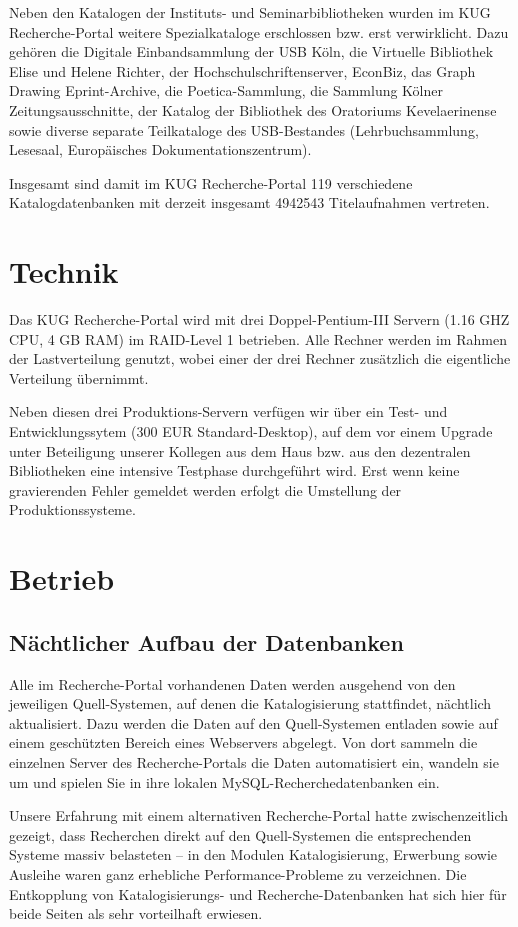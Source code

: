 \documentclass[11pt, twoside, a4paper, BCOR8mm, DIV12, bibtotoc,idxtotoc]{scrbook}
\begin{document}
Neben den Katalogen der Instituts- und Seminarbibliotheken wurden im
KUG Recherche-Portal weitere Spezialkataloge
erschlossen bzw. erst verwirklicht. Dazu gehören die Digitale
Einband\-samm\-lung der USB Köln, die Virtuelle Bibliothek Elise und
Helene Richter, der Hoch\-schul\-schrif\-ten\-ser\-ver, EconBiz, das Graph
Drawing Eprint-Archive, die Poetica-Sammlung, die Sammlung Kölner
Zeitungsausschnitte, der Katalog der  Bibliothek des Oratoriums
Kevelaerinense sowie diverse separate Teilkataloge des USB-Bestandes
(Lehrbuchsammlung, Lesesaal, Europäisches Do\-ku\-men\-ta\-tions\-zen\-trum).

Insgesamt sind damit im KUG Recherche-Portal 119 verschiedene
Katalogdatenbanken mit derzeit insgesamt 4942543 Titelaufnahmen
vertreten.

\section{Technik}
Das KUG Recherche-Portal wird mit drei Doppel-Pentium-III Servern
(1.16 GHZ CPU, 4 GB RAM) im RAID-Level 1 betrieben. Alle Rechner
werden im Rahmen der Lastverteilung genutzt, wobei einer der drei
Rechner zusätzlich die eigentliche Verteilung übernimmt.

Neben diesen drei Produktions-Servern verfügen wir über ein Test-
und Entwicklungssytem (300 EUR Standard-Desktop), auf dem vor einem
Upgrade unter Beteiligung unserer Kollegen aus dem Haus bzw. aus den
dezentralen Bibliotheken eine intensive Testphase durchgeführt wird.
Erst wenn keine gravierenden Fehler gemeldet werden erfolgt die
Umstellung der Produktionssysteme.

\section{Betrieb}
\subsection{Nächtlicher Aufbau der Datenbanken}
Alle im Recherche-Portal vorhandenen Daten werden ausgehend von den
jeweiligen Quell-Sys\-te\-men, auf denen die Katalogisierung stattfindet,
nächtlich aktualisiert. Dazu werden die Daten auf den Quell-Systemen
entladen sowie auf einem geschützten Bereich eines Webservers
abgelegt. Von dort sammeln die einzelnen Server des Recherche-Portals
die Daten automatisiert ein, wandeln sie um und spielen Sie in ihre
lokalen MySQL-Recherchedatenbanken ein.

Unsere Erfahrung mit einem alternativen Recherche-Portal hatte
zwischenzeitlich gezeigt, dass Recherchen direkt auf den
Quell-Systemen die entsprechenden Systeme massiv belasteten -- in den
Modulen Katalogisierung, Erwerbung sowie Ausleihe waren ganz
erhebliche Performance-Probleme zu verzeichnen. Die Entkopplung von
Katalogisierungs- und Recherche-Datenbanken hat sich hier für beide
Seiten als sehr vorteilhaft erwiesen.
\end{document}
